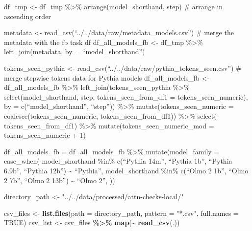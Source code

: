 \documentclass[
]{article}
\newenvironment{Shaded}{\begin{snugshade}}{\end{snugshade}}
\newcommand{\AttributeTok}[1]{\textcolor[rgb]{0.13,0.29,0.53}{#1}}
\newcommand{\ConstantTok}[1]{\textcolor[rgb]{0.56,0.35,0.01}{#1}}
\newcommand{\FunctionTok}[1]{\textcolor[rgb]{0.13,0.29,0.53}{\textbf{#1}}}
\newcommand{\NormalTok}[1]{#1}
\newcommand{\OtherTok}[1]{\textcolor[rgb]{0.56,0.35,0.01}{#1}}
\newcommand{\SpecialCharTok}[1]{\textcolor[rgb]{0.81,0.36,0.00}{\textbf{#1}}}
\newcommand{\StringTok}[1]{\textcolor[rgb]{0.31,0.60,0.02}{#1}}
\begin{document}
df\_tmp \textless- df\_tmp \%\textgreater\% arrange(model\_shorthand,
step) \# arrange in ascending order

metadata \textless- read\_csv(``../../data/raw/metadata\_models.csv'')
\# merge the metadata with the fb task df df\_all\_models\_fb \textless-
df\_tmp \%\textgreater\% left\_join(metadata, by = ``model\_shorthand'')

tokens\_seen\_pythia \textless-
read\_csv(``../../data/raw/pythia\_tokens\_seen.csv'') \# merge stepwise
tokens data for Pythia models df\_all\_models\_fb \textless-
df\_all\_models\_fb \%\textgreater\% left\_join(tokens\_seen\_pythia
\%\textgreater\% select(model\_shorthand, step, tokens\_seen\_from\_df1
= tokens\_seen\_numeric), by = c(``model\_shorthand'', ``step''))
\%\textgreater\% mutate(tokens\_seen\_numeric =
coalesce(tokens\_seen\_numeric, tokens\_seen\_from\_df1))
\%\textgreater\% select(-tokens\_seen\_from\_df1) \%\textgreater\%
mutate(tokens\_seen\_numeric\_mod = tokens\_seen\_numeric + 1)

df\_all\_models\_fb = df\_all\_models\_fb \%\textgreater\%
mutate(model\_family = case\_when( model\_shorthand \%in\% c(``Pythia
14m'', ``Pythia 1b'', ``Pythia 6.9b'', ``Pythia 12b'') \textasciitilde{}
``Pythia'', model\_shorthand \%in\% c(``Olmo 2 1b'', ``Olmo 2 7b'',
``Olmo 2 13b'') \textasciitilde{} ``Olmo 2'', ))

\begin{Shaded}
\begin{Highlighting}[]
\NormalTok{directory\_path }\OtherTok{\textless{}{-}} \StringTok{"../../data/processed/attn{-}checks{-}local/"}

\NormalTok{csv\_files }\OtherTok{\textless{}{-}} \FunctionTok{list.files}\NormalTok{(}\AttributeTok{path =}\NormalTok{ directory\_path, }\AttributeTok{pattern =} \StringTok{"*.csv"}\NormalTok{, }\AttributeTok{full.names =} \ConstantTok{TRUE}\NormalTok{)}
\NormalTok{csv\_list }\OtherTok{\textless{}{-}}\NormalTok{ csv\_files }\SpecialCharTok{\%\textgreater{}\%}
  \FunctionTok{map}\NormalTok{(}\SpecialCharTok{\textasciitilde{}} \FunctionTok{read\_csv}\NormalTok{(.))}
\end{Highlighting}
\end{Shaded}
\end{document}
